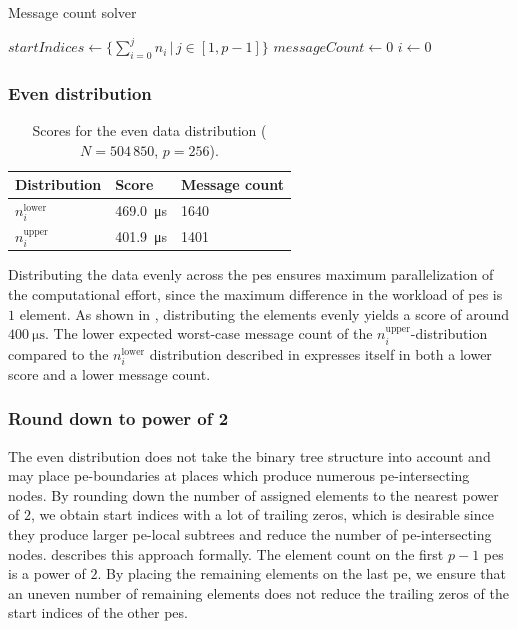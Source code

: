 \begin{algorithm}
\caption{Message count solver}\label{algo:MessageCountSolver}
\DontPrintSemicolon
\SetAlgoLined
$startIndices \gets \{\sum_{i=0}^j n_i \,\big|\, j \in [1, p-1] \}$\;
$messageCount \gets 0$\;
$i \gets 0$\; 
\end{algorithm}



\subsubsection{Even distribution}

\begin{table}
\centering
\caption{Scores for the even data distribution ($N = 504\,850$, $p=256$).}
\label{table:EvenDistributionScores}
\begin{tabular}{l|l|l}
Distribution & Score & Message count \\
\hline
$n_i^\textrm{lower}$ & \SI{469.0}{\micro\second} & 1640 \\
$n_i^\textrm{upper}$ & \SI{401.9}{\micro\second} & 1401
\end{tabular}
\end{table}
Distributing the data evenly across the \glspl{pe} ensures maximum parallelization of the computational effort, since the maximum difference in the workload of \glspl{pe} is $1$ element.
As shown in , distributing the elements evenly yields a score of around $\SI{400}{\micro\second}$.
The lower expected worst-case message count of the $n_i^\textrm{upper}$-distribution compared to the $n_i^\textrm{lower}$ distribution described in  expresses itself in both a lower score and a lower message count.

\subsubsection{Round down to power of 2}
\label{sec:roundDownPower2Distribution}
The even distribution does not take the binary tree structure into account and may place \gls{pe}-boundaries at places which produce numerous \gls{pe}-intersecting nodes.
By rounding down the number of assigned elements to the nearest power of $2$, we obtain start indices with a lot of trailing zeros, which is desirable since they produce larger \gls{pe}-local subtrees and reduce the number of \gls{pe}-intersecting nodes.
 describes this approach formally.
The element count on the first $p - 1$ \glspl{pe} is a power of $2$.
By placing the remaining elements on the last \gls{pe}, we ensure that an uneven number of remaining elements does not reduce the trailing zeros of the start indices of the other \glspl{pe}.

